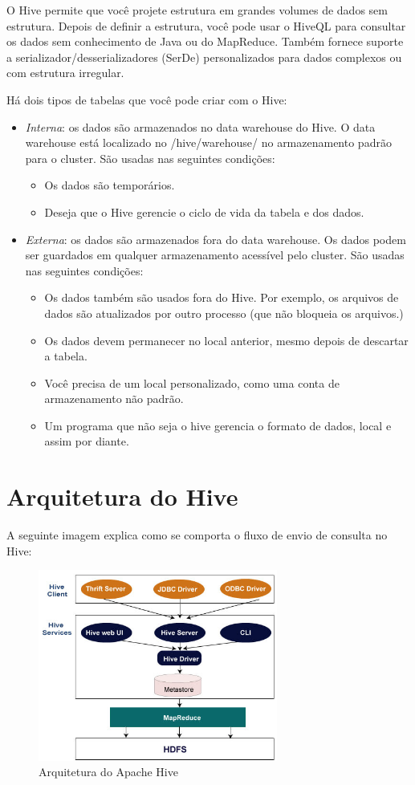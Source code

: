 \documentclass[a4paper,11pt]{article}
\begin{document}
O Hive permite que você projete estrutura em grandes volumes de dados sem estrutura. Depois de definir a estrutura, você pode usar o HiveQL para consultar os dados sem conhecimento de Java ou do MapReduce. Também fornece suporte a serializador/desserializadores (SerDe) personalizados para dados complexos ou com estrutura irregular.

Há dois tipos de tabelas que você pode criar com o Hive:
\begin{itemize}
	\item \textit{Interna}: os dados são armazenados no data warehouse do Hive. O data warehouse está localizado no /hive/warehouse/ no armazenamento padrão para o cluster. São usadas nas seguintes condições:
	\begin{itemize}
		\item Os dados são temporários.
		\item Deseja que o Hive gerencie o ciclo de vida da tabela e dos dados.
	\end{itemize}
	\item \textit{Externa}: os dados são armazenados fora do data warehouse. Os dados podem ser guardados em qualquer armazenamento acessível pelo cluster. São usadas nas seguintes condições:
   	\begin{itemize}
   		\item Os dados também são usados fora do Hive. Por exemplo, os arquivos de dados são atualizados por outro processo (que não bloqueia os arquivos.)
   		\item Os dados devem permanecer no local anterior, mesmo depois de descartar a tabela.
   		\item Você precisa de um local personalizado, como uma conta de armazenamento não padrão.
   		\item Um programa que não seja o hive gerencia o formato de dados, local e assim por diante.
    \end{itemize}
\end{itemize}

\section{Arquitetura do Hive}
A seguinte imagem explica como se comporta o fluxo de envio de consulta no Hive:
\begin{figure}[H]
	\centering
	\includegraphics[width=0.7\textwidth]{imagem/architecture.jpg}
	\caption{Arquitetura do Apache Hive}
\end{figure}
\end{document}

